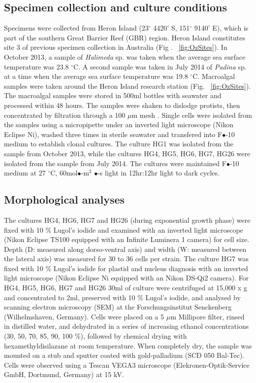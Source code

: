 \documentclass[12pt]{article}
\begin{document}
\subsection{Specimen collection and culture conditions}
Specimens were collected from Heron Island (23$^{\circ}$ 4420' S, 151$^{\circ}$ 9140' E), which is part of the southern Great Barrier Reef (GBR) region. Heron Island constitutes site 3 of previous specimen collection in Australia (Fig . ~\ref{fig:OzSites}).
In October 2013, a sample of \emph{Halimeda} sp. was taken when the average sea surface temperature was 23.8 $^{\circ}$C. 
A second sample was taken in July 2014 of \emph{Padina} sp. at a time when the average sea surface temperature was 19.8 $^{\circ}$C.
Macroalgal samples were taken around the Heron Island research station (Fig. ~\ref{fig:OzSites}). The macroalgal samples were stored in 500ml bottles with seawater and processed within 48 hours. The samples were shaken to dislodge protists, then concentrated by filtration through a 100 $\mu$m mesh \citep{litaker2010global}. Single cells were isolated from the samples using a micropipette under an inverted light microscope (Nikon Eclipse Ni), washed three times in sterile seawater and transfered into F$\bullet$-10 medium \citep{holmes1991strain} to establish clonal cultures.
The culture HG1 was isolated from the sample from October 2013, while the cultures HG4, HG5, HG6, HG7, HG26 were isolated from the sample from July 2014.
The cultures were maintained F$\bullet$-10 medium at 27 $^{\circ}$C, 60mol$\bullet$-m$^{2}$ $\bullet$-s light in 12hr:12hr light to dark cycles.





\subsection{Morphological analyses}
The cultures HG4, HG6, HG7 and HG26 (during exponential growth phase) were fixed with 10 \% Lugol's iodide and examined with an inverted light microscope (Nikon Eclipse TS100 equipped with an Infinite Luminera 1 camera) for cell size. Depth (D: measured along dorso-ventral axis) and width (W: measured between the lateral axis) was measured for 30 to 36 cells per strain.
The culture HG7 was fixed with 10 \% Lugol's iodide for plastid and nucleus diagnosis with an inverted light microscope (Nikon Eclipse Ni equipped with an Nikon DS-Qi2 camera).
For HG4, HG5, HG6, HG7 and HG26 30ml of culture were centrifuged at 15,000 x g and concentrated to 2ml, preserved with 10 \% Lugol's iodide, and analysed by scanning electron microscopy (SEM) at the Forschungsinstitut Senckenberg (Wilhelmshaven, Germany). 
Cells were placed on a 5 $\mu$m Millipore filter, rinsed in distilled water, and dehydrated in a series of increasing ethanol concentrations (30, 50, 70, 85, 90, 100 \%), followed by chemical drying with hexamethyldisilazane at room temperature. When completely dry, the sample was mounted on a stub and sputter coated with gold-palladium (SCD 050 Bal-Tec). Cells were observed using a Tescan VEGA3 microscope (Elekronen-Optik-Service GmbH, Dortmund, Germany) at 15 kV.
\end{document}
